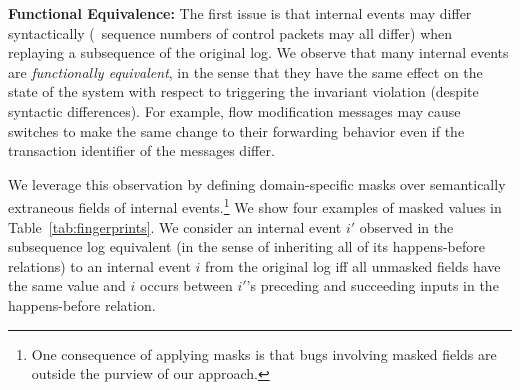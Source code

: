 
{\bf Functional Equivalence: }The first issue is that internal events may differ syntactically (\eg~sequence numbers
of control packets may all differ) when replaying a subsequence of the original log.
We observe that many internal events are {\em functionally
equivalent}, in the sense that they
have the same effect on the state of the system with respect to triggering the
invariant violation (despite syntactic differences). For example, flow
modification messages may cause switches to make the same change to their forwarding behavior
even if the transaction identifier of the messages differ.

We leverage this observation by defining
domain-specific masks over semantically extraneous fields of
internal events.\footnote{One consequence
of applying masks is that bugs involving masked fields are outside the purview of
our approach.} We show four examples of masked values
in Table~\ref{tab:fingerprints}. We consider an internal event $i'$ observed in the subsequence log
equivalent (in the sense of inheriting all of its happens-before relations) to an internal event $i$ from the original log iff all unmasked
fields have the same value
and $i$ occurs between $i'$'s preceding and succeeding inputs in the
happens-before relation.


